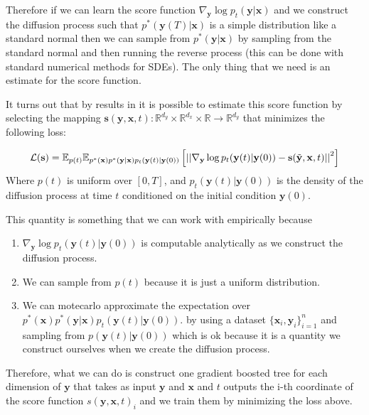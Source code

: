 Therefore if we can learn the score function $\nabla_{\mathbf{y}} \log p_t(\mathbf{y}| \mathbf{x})$
and we construct the diffusion process such that $p^*(\mathbf{y}(T)|\mathbf{x})$ is a
simple distribution like a standard normal then we can sample from $p^*(\mathbf{y}|\mathbf{x})$
by sampling from the standard normal and then running the reverse process
(this can be done with standard numerical methods for SDEs). The only thing
that we need is an estimate for the score function.
\vskip 0.1in

It turns out that by results in \cite{vincent2010connection} it is possible to estimate this score function by
 selecting the mapping $\mathbf{s}(\mathbf{y}, \mathbf{x}, t): \mathbb{R}^{d_y} \times \mathbb{R}^{d_x} \times \mathbb{R} \to \mathbb{R}^{d_y}$
 that minimizes the following loss:

\begin{align}
\mathcal{L}(\mathbf{s}) = \mathbb{E}_{p(t)}\mathbb{E}_{p^*(\mathbf{x})p^*(\mathbf{y}|\mathbf{x}) p_t(\mathbf{y}(t)|\mathbf{y}(0))} \left[ \left|\left| \nabla_{\mathbf{y}} \log p_{t}(\mathbf{y}(t)|\mathbf{y}(0)) - \mathbf{s}(\tilde{\mathbf{y}}, \mathbf{x}, t) \right|\right|^2 \right]
\end{align}
Where $p(t)$ is uniform over $[0, T]$, and $p_t(\mathbf{y}(t)|\mathbf{y}(0))$ is the density of the diffusion process at time $t$ conditioned
on the initial condition $\mathbf{y}(0)$.

This quantity is something that we can work with empirically because
\begin{enumerate}
    \item $ \nabla_{\mathbf{y}} \log p_{t}(\mathbf{y}(t)|\mathbf{y}(0))$ is computable analytically as we construct the
    diffusion process.
    \item We can sample from $p(t)$ because it is just a uniform distribution.
    \item We can motecarlo approximate the expectation over $p^*(\mathbf{x})p^*(\mathbf{y}|\mathbf{x}) p_t(\mathbf{y}(t)|\mathbf{y}(0))$.
    by using a dataset $\{ \mathbf{x}_i, \mathbf{y}_i \}_{i=1}^n$ and sampling from $p(\mathbf{y}(t)|\mathbf{y}(0))$
    which is ok because it is a quantity we construct ourselves when we create the diffusion process.
\end{enumerate}

Therefore, what we can do is construct one gradient boosted tree for each dimension of $\mathbf{y}$
that takes as input $\mathbf{y}$ and $\mathbf{x}$ and $t$  outputs the i-th coordinate of the score function
$s(\mathbf{y}, \mathbf{x}, t)_i$ and we train them by minimizing the loss above.

